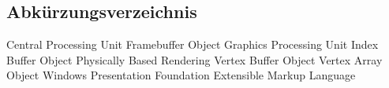 \begin{acronym}
	\chapter*{Abkürzungsverzeichnis}
	 {Central Processing Unit}
	 {Framebuffer Object}
	 {Graphics Processing Unit}
	 {Index Buffer Object}
	 {Physically Based Rendering}
	 {Vertex Buffer Object}
	 {Vertex Array Object}
		{Windows Presentation Foundation}
	 {Extensible Markup Language}
\end{acronym}